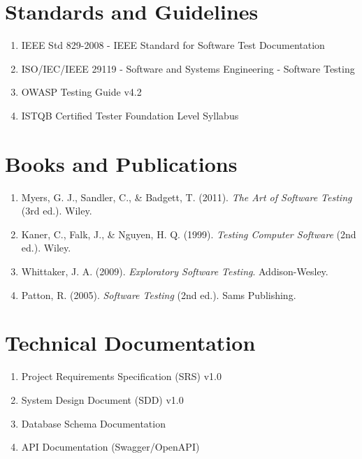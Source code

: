 \documentclass[12pt,a4paper]{report}
\begin{document}
\section{Standards and Guidelines}
\begin{enumerate}
    \item IEEE Std 829-2008 - IEEE Standard for Software Test Documentation
    \item ISO/IEC/IEEE 29119 - Software and Systems Engineering - Software Testing
    \item OWASP Testing Guide v4.2
    \item ISTQB Certified Tester Foundation Level Syllabus
\end{enumerate}

\section{Books and Publications}
\begin{enumerate}
    \item Myers, G. J., Sandler, C., \& Badgett, T. (2011). \textit{The Art of Software Testing} (3rd ed.). Wiley.
    \item Kaner, C., Falk, J., \& Nguyen, H. Q. (1999). \textit{Testing Computer Software} (2nd ed.). Wiley.
    \item Whittaker, J. A. (2009). \textit{Exploratory Software Testing}. Addison-Wesley.
    \item Patton, R. (2005). \textit{Software Testing} (2nd ed.). Sams Publishing.
\end{enumerate}

\section{Technical Documentation}
\begin{enumerate}
    \item Project Requirements Specification (SRS) v1.0
    \item System Design Document (SDD) v1.0
    \item Database Schema Documentation
    \item API Documentation (Swagger/OpenAPI)
\end{enumerate}
\end{document}

